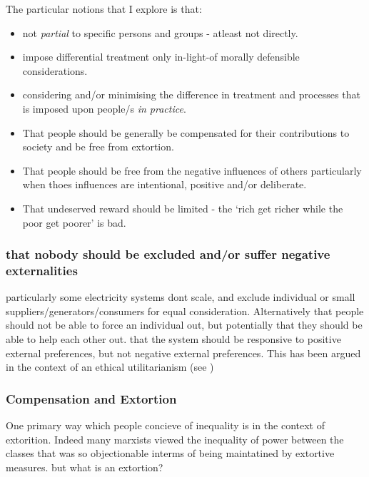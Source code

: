 \documentclass{article}
\begin{document}
The particular notions that I explore is that:
\begin{itemize}
    \item not \textit{partial} to specific persons and groups - atleast not directly.
    \item impose differential treatment only in-light-of morally defensible considerations.
    \item considering and/or minimising the difference in treatment and processes that is imposed upon people/s \textit{in practice}.
    \item That people should be generally be compensated for their contributions to society and be free from extortion.
    \item That people should be free from the negative influences of others particularly when thoes influences are intentional, positive and/or deliberate.
    \item That undeserved reward should be limited - the `rich get richer while the poor get poorer' is bad.
\end{itemize}

\subsubsection{that nobody should be excluded and/or suffer negative externalities}

particularly some electricity systems dont scale, and exclude individual or small suppliers/generators/consumers for equal consideration.
Alternatively that people should not be able to force an individual out, but potentially that they should be able to help each other out.
that the system should be responsive to positive external preferences, but not negative external preferences.
This has been argued in the context of an ethical utilitarianism (see \cite{kymlicka2002contemporary})

\subsubsection{Compensation and Extortion}

One primary way which people concieve of inequality is in the context of extorition. Indeed many marxists viewed the inequality of power between the classes that was so objectionable interms of being maintatined by extortive measures.
but what is an extortion?
\end{document}
